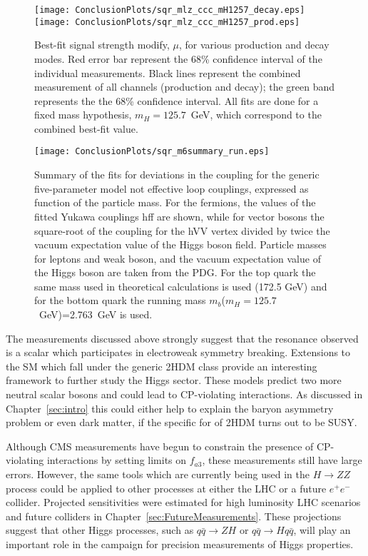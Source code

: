 \begin{figure}
\begin{center}
\texttt{[image: ConclusionPlots/sqr\_mlz\_ccc\_mH1257\_decay.eps]}
\texttt{[image: ConclusionPlots/sqr\_mlz\_ccc\_mH1257\_prod.eps]}
\caption{Best-fit signal strength modify, $\mu$, for various 
production and decay modes.  Red error bar represent the 68\%
confidence interval of the individual measurements.  Black lines
represent the combined measurement of all channels (production and
decay); the green band represents the the 68\% confidence interval.
All fits are done for a fixed mass hypothesis, $m_H=125.7$~GeV, 
which correspond to the combined best-fit value.}
\label{fig:crossSectionsByChannel}
\end{center}
\end{figure}

\begin{figure}
\begin{center}
\texttt{[image: ConclusionPlots/sqr\_m6summary\_run.eps]}
\caption{Summary of the fits for deviations in the coupling for the generic five-parameter model not effective loop couplings, expressed as function of the particle mass. For the fermions, the values of the fitted Yukawa couplings hff are shown, while for vector bosons the square-root of the coupling for the hVV vertex divided by twice the vacuum expectation value of the Higgs boson field. Particle masses for leptons and weak boson, and the vacuum expectation value of the Higgs boson are taken from the PDG. For the top quark the same mass used in theoretical calculations is used (172.5 GeV) and for the bottom quark the running mass $m_b$($m_H=125.7$~GeV)=2.763~GeV is used.}
\label{fig:couplingMeasurements}
\end{center}
\end{figure}

The measurements discussed above strongly suggest that the 
resonance observed is a scalar which participates in
electroweak symmetry breaking.  Extensions to the SM which 
fall under the generic 2HDM class provide an interesting
framework to further study the Higgs sector.  These models
predict two more neutral scalar bosons and could lead to 
CP-violating interactions.  As discussed in Chapter~\ref{sec:intro}
this could either help to explain the baryon asymmetry problem
or even dark matter, if the specific for of 2HDM turns out
to be SUSY.

Although CMS measurements have begun to constrain the presence
of CP-violating interactions by setting limits on $f_{a3}$, 
these measurements still have large errors.  However, the same
tools which are currently being used in the $H\to ZZ$ process 
could be applied to other processes at either the LHC or a
future $e^+e^-$ collider.    Projected sensitivities were
estimated for high luminosity LHC scenarios
and future colliders in Chapter~\ref{sec:FutureMeasurements}.
These projections suggest that other Higgs processes, such as 
$q\bar{q}\to ZH$ or $q\bar{q}\to Hq\bar{q}$, will play 
an important role in the campaign for precision measurements
of Higgs properties.   

